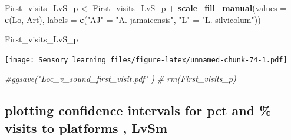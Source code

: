\documentclass[]{article}
\newenvironment{Shaded}{\begin{snugshade}}{\end{snugshade}}
\newcommand{\KeywordTok}[1]{\textcolor[rgb]{0.13,0.29,0.53}{\textbf{{#1}}}}
\newcommand{\DataTypeTok}[1]{\textcolor[rgb]{0.13,0.29,0.53}{{#1}}}
\newcommand{\StringTok}[1]{\textcolor[rgb]{0.31,0.60,0.02}{{#1}}}
\newcommand{\CommentTok}[1]{\textcolor[rgb]{0.56,0.35,0.01}{\textit{{#1}}}}
\newcommand{\NormalTok}[1]{{#1}}
\begin{document}
\begin{Shaded}
\begin{Highlighting}[]
\NormalTok{First_visits_LvS_p  <-}\StringTok{ }\NormalTok{First_visits_LvS_p  +}\StringTok{ }\KeywordTok{scale_fill_manual}\NormalTok{(}\DataTypeTok{values =} \KeywordTok{c}\NormalTok{(Lo, Art), }\DataTypeTok{labels =} \KeywordTok{c}\NormalTok{(}\StringTok{"AJ"} \NormalTok{=}\StringTok{ "A. jamaicensis"}\NormalTok{, }\StringTok{"L"} \NormalTok{=}\StringTok{ "L. silvicolum"}\NormalTok{))}

\NormalTok{First_visits_LvS_p}
\end{Highlighting}
\end{Shaded}

\texttt{[image: Sensory\_learning\_files/figure-latex/unnamed-chunk-74-1.pdf]}

\begin{Shaded}
\begin{Highlighting}[]
  \CommentTok{#ggsave("Loc_v_sound_first_visit.pdf"  )}
 \CommentTok{# rm(First_visits_p)}
\end{Highlighting}
\end{Shaded}

\subsection{plotting confidence intervals for pct and \% visits to
platforms ,
LvSm}\label{plotting-confidence-intervals-for-pct-and-visits-to-platforms-lvsm}
\end{document}
